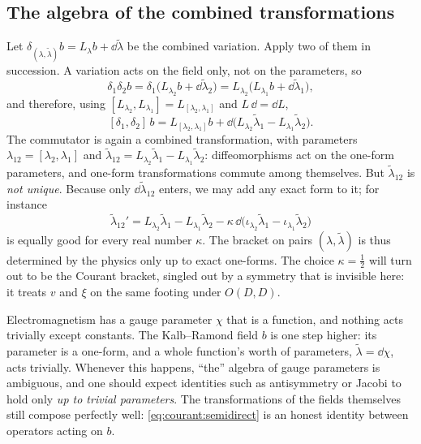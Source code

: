 \subsection{The algebra of the combined transformations}

Let $\delta_{(\lambda,\tilde\lambda)}b=L_\lambda b+\dd\tilde\lambda$ be the combined variation.
Apply two of them in succession. A variation acts on the field only, not on the parameters, so
\[
\delta_1\delta_2 b=\delta_1\bigl(L_{\lambda_2}b+\dd\tilde\lambda_2\bigr)
=L_{\lambda_2}\bigl(L_{\lambda_1}b+\dd\tilde\lambda_1\bigr) ,
\]
and therefore, using $[L_{\lambda_2},L_{\lambda_1}]=L_{[\lambda_2,\lambda_1]}$ and
$L\,\dd=\dd L$,
\begin{equation}\label{eq:courant:semidirect}
[\delta_1,\delta_2]\,b=L_{[\lambda_2,\lambda_1]}b
+\dd\bigl(L_{\lambda_2}\tilde\lambda_1-L_{\lambda_1}\tilde\lambda_2\bigr).
\end{equation}
The commutator is again a combined transformation, with parameters
$\lambda_{12}=[\lambda_2,\lambda_1]$ and
$\tilde\lambda_{12}=L_{\lambda_2}\tilde\lambda_1-L_{\lambda_1}\tilde\lambda_2$: diffeomorphisms
act on the one-form parameters, and one-form transformations commute among themselves. But
$\tilde\lambda_{12}$ is \emph{not unique}. Because only $\dd\tilde\lambda_{12}$ enters, we may add
any exact form to it; for instance
\begin{equation}\label{eq:courant:ambiguity}
\tilde\lambda_{12}'=L_{\lambda_2}\tilde\lambda_1-L_{\lambda_1}\tilde\lambda_2
-\kappa\,\dd\bigl(\iota_{\lambda_2}\tilde\lambda_1-\iota_{\lambda_1}\tilde\lambda_2\bigr)
\end{equation}
is equally good for every real number $\kappa$. The bracket on pairs $(\lambda,\tilde\lambda)$ is
thus determined by the physics only up to exact one-forms. The choice $\kappa=\tfrac12$ will turn
out to be the Courant bracket, singled out by a symmetry that is invisible here: it treats $v$ and
$\xi$ on the same footing under $O(D,D)$.

\begin{physicsbox}
Electromagnetism has a gauge parameter $\chi$ that is a function, and nothing acts trivially
except constants. The Kalb--Ramond field $b$ is one step higher: its parameter is a one-form, and
a whole function's worth of parameters, $\tilde\lambda=\dd\chi$, acts trivially. Whenever this
happens, ``the'' algebra of gauge parameters is ambiguous, and one should expect identities
such as antisymmetry or Jacobi to hold only \emph{up to trivial parameters}. The transformations
of the fields themselves still compose perfectly well: \eqref{eq:courant:semidirect} is an honest
identity between operators acting on $b$.
\end{physicsbox}

